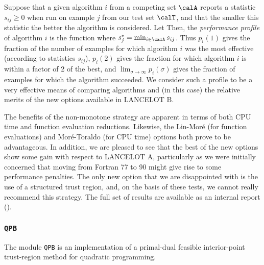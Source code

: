 \documentclass[twoside]{article}
\newcommand{\lana}{{\sf LANCELOT A}}
\newcommand{\lanb}{{\sf LANCELOT B}}
\newcommand{\ltsubsubsection}[1]{\subsubsection{{\tt #1}} \label{#1}}
\begin{document}
Suppose that a given algorithm $i$ from a competing set $\calA$
reports a statistic $s_{ij} \geq 0$ 
when run on example $j$ from our test set $\calT$,
and that the smaller this statistic the better the algorithm is considered.
Let 
Then, the {\em performance profile} of algorithm $i$ is the function 
where $s^*_j = \min_{i \in \calA} s_{ij}$.
Thus $p_i(1)$ gives the fraction of the number of examples for which 
algorithm $i$ was the most effective (according to statistics $s_{ij}$),
$p_i(2)$ gives 
the fraction for which algorithm $i$ 
is within a factor of 2 of the best, and $\lim_{\sigma\longrightarrow\infty}
p_i(\sigma)$ gives the fraction of examples for which the algorithm
succeeded. We consider such a profile to be a very effective means
of comparing algorithms and (in this case)
the relative merits of the new options available in \lanb.

The benefits of the non-monotone strategy
are apparent in terms of both CPU time and function evaluation reductions.
Likewise, the Lin-Mor\'{e} (for function evaluations) 
and Mor\'{e}-Toraldo (for CPU time) options both prove to be advantageous.
In addition, we are pleased to see that 
the best of the new options show some gain with respect to 
\lana, particularly as we were initially concerned that moving from 
Fortran 77 to 90 might give rise to some performance penalties.
The only new option that we are disappointed with is the use of a
structured trust region, and, on the basis of these tests, 
we cannot really recommend this strategy. The full set of results
are available as an internal report ().

\ltsubsubsection{QPB}

The module {\tt QPB} is an implementation of a primal-dual 
feasible interior-point trust-region method for quadratic programming.
\end{document}
